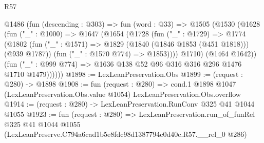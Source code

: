 \begin{lexlean}{R57}
\begin{coremodule}
      @1486
        (fun (descending : @303) =>
        fun (word : @33) =>
        @1505
          (@1530
            (@1628
              (fun ("_" : @1000) =>
              @1647
                (@1654
                  (@1728
                    (fun ("_" : @1729) =>
                    @1774
                      (@1802
                        (fun ("_" : @1571) => @1829 (@1840 (@1846 @1853 (@451 @1818))) (@939 @1787))
                        (fun ("_" : @1570 @774) => @1853))))
                  @1710)
                (@1464 @1642))
              (fun ("_" : @999 @774) => @1636 @138 @52 @96 @316 @316 @296 @1476 @1710 @1479))))))
@1898 := LexLeanPreservation.Obs
@1899 := (request : @280) -> @1898
@1908 := fun (request : @280) =>
  cond.{1} @1898 @1047 (LexLeanPreservation.Obs.value @1054) LexLeanPreservation.Obs.overflow
@1914 := (request : @280) -> LexLeanPreservation.RunConv @325 @41 @1044 @1055
@1923 := fun (request : @280) =>
  LexLeanPreservation.run_of_funRel
    @325
    @41
    @1044
    @1055
    (LexLeanPreserve.C794a6cad1b5e8fdc98d1387794c0d40c.R57.__rel_0 @286)
\end{coremodule}
\end{lexlean}
